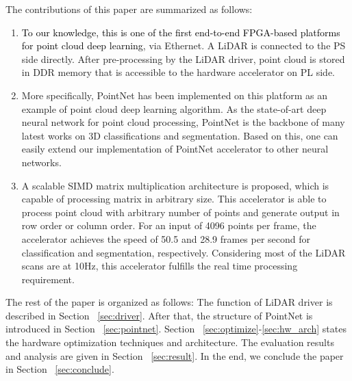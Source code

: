 \documentclass[conference]{IEEEtran}
\begin{document}
The contributions of this paper are summarized as follows:
\begin{enumerate}
    \item \textcolor{black}{To our knowledge, this is one of the first end-to-end FPGA-based platforms for point cloud deep learning}, via Ethernet. A LiDAR is connected to the PS side directly. After pre-processing by the LiDAR driver, point cloud is stored in DDR memory that is accessible to the hardware accelerator on PL side.
    \item More specifically, PointNet has been implemented on this platform as an example of point cloud deep learning algorithm. As the state-of-art deep neural network for point cloud processing, PointNet is the backbone of many latest works on 3D classifications and segmentation. Based on this, one can easily extend our implementation of PointNet accelerator to other neural networks.
    \item A scalable SIMD matrix multiplication architecture is proposed, which is capable of processing matrix in arbitrary size. This accelerator is able to process point cloud with arbitrary number of points and generate output in row order or column order. For an input of 4096 points per frame, the accelerator achieves the speed of 50.5 and 28.9 frames per second for classification and segmentation, respectively. Considering most of the LiDAR scans are at 10Hz, this accelerator fulfills the real time processing requirement.
\end{enumerate}

The rest of the paper is organized as follows: The function of LiDAR driver is described in Section ~\ref{sec:driver}. After that, the structure of PointNet is introduced in Section ~\ref{sec:pointnet}. Section ~\ref{sec:optimize}-\ref{sec:hw_arch} states the hardware optimization techniques and architecture. The evaluation results and analysis are given in Section ~\ref{sec:result}. In the end, we conclude the paper in Section ~\ref{sec:conclude}.
\end{document}
